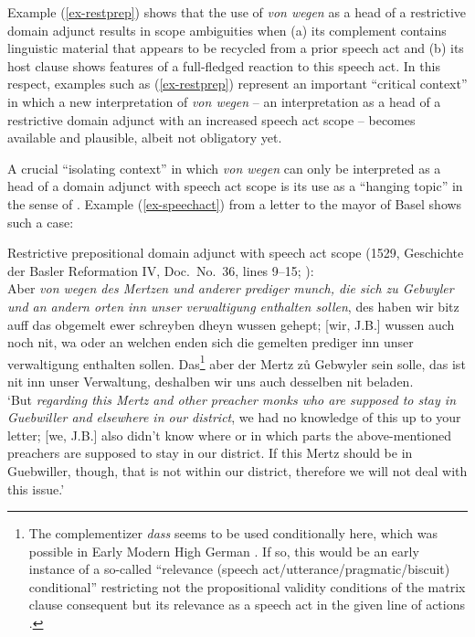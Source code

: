 \documentclass[output=paper
  ,nobabel
  ,draftmode
  ,babelshorthands
  ,colorlinks, citecolor=brown
]{langscibook}
\begin{document}
Example (\ref{ex-restprep}) shows that the use of \emph{von wegen} as a head of a restrictive domain adjunct results in scope ambiguities when (a) its complement contains linguistic material that appears to be recycled from a prior speech act and (b) its host clause shows features of a full-fledged reaction to this speech act. In this respect, examples such as (\ref{ex-restprep}) represent an important ``critical context'' \citep[cf.][]{Diewald2002} in which a new interpretation of \emph{von wegen} -- an interpretation as a head of a restrictive domain adjunct with an increased speech act scope – becomes available and plausible, albeit not obligatory yet.

A crucial ``isolating context'' \citep{Diewald2002} in which \emph{von wegen} can only be interpreted as a head of a domain adjunct with speech act scope is its use as a ``hanging topic'' in the sense of \citet{Altmann1981}. Example (\ref{ex-speechact}) from a letter to the mayor of Basel shows such a case:

\eanoraggedright\label{ex-speechact} Restrictive prepositional domain adjunct with speech act scope
(1529, Geschichte der Basler Reformation IV, Doc.\ No.\ 36, lines 9--15; %
\citealp[34]{Roth1941}):\\[2pt]
\sloppy
Aber \emph{von wegen des Mertzen und anderer prediger munch, die sich zu \mbox{Gebwyler} und an andern
  orten inn unser verwaltigung enthalten sollen}, des haben wir bitz auff das obgemelt ewer
schreyben dheyn wussen gehept; [wir, J.B.] wussen auch noch nit, wa oder an welchen enden sich die
gemelten prediger inn unser verwaltigung enthalten sollen. Das\footnote{The complementizer
  \emph{dass} seems to be used conditionally here, which was possible in Early Modern High
  German \citep[cf.][821]{GrimmGrimm1860}. If so, this would be an early instance of a so-called “relevance (speech act/utterance/pragmatic/biscuit) conditional” restricting not the propositional validity conditions of the matrix clause consequent but its relevance as a speech act in the given line of actions \citep[e.g.][]{Austin1956, Sweetser1990,Guenthner1999}.}
aber der Mertz zů Gebwyler sein solle, das ist nit inn unser Verwaltung, deshalben wir uns auch desselben nit beladen. \\
	`But \emph{regarding this Mertz and other preacher monks who are supposed to stay in Guebwiller and elsewhere in our district}, we had no knowledge of this up to your letter; [we, J.B.] also didn’t know where or in which parts the above-mentioned preachers are supposed to stay in our district. If this Mertz should be in Guebwiller, though, that is not within our district, therefore we will not deal with this issue.'
\z
\end{document}
